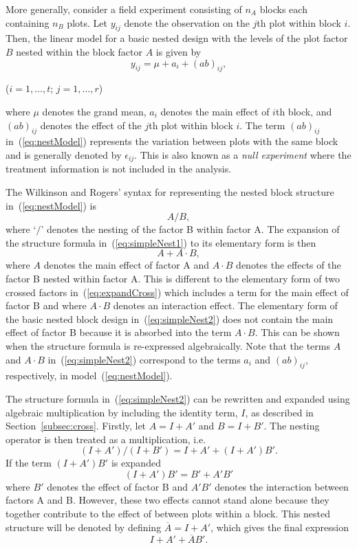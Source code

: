 \documentclass[article]{jss}
\begin{document}
More generally, consider a field experiment consisting of $n_A$ blocks each containing $n_B$ plots. Let $y_{ij}$ denote the observation on the $j$th plot within block $i$. Then, the linear model for a basic nested design with the levels of the plot factor $B$ nested within the block factor $A$ is given by
\begin{equation}\label{eq:nestModel}
y_{ij}= \mu + a_{i} + (ab)_{ij},
\end{equation}
\begin{center}
($i=1,\dots ,t$; $j=1,\dots,r$)
\end{center}
where $\mu$ denotes the grand mean, $a_{i}$ denotes the main effect of $i$th block, and $(ab)_{ij}$ denotes the effect of the $j$th plot within block $i$. The term $(ab)_{ij}$ in~(\ref{eq:nestModel}) represents the variation between plots with the same block and is generally denoted by $\epsilon_{ij}$. This is also known as a \emph{null experiment} where the treatment information is not included in the analysis.

The Wilkinson and Rogers' syntax for representing the nested block structure in~(\ref{eq:nestModel}) is
\begin{equation} \label{eq:simpleNest1}
A/B,
\end{equation}
where `$/$' denotes the nesting of the factor B within factor A. The expansion of the structure formula in~(\ref{eq:simpleNest1}) to its elementary form is then
\begin{equation}\label{eq:simpleNest2}
A + A\cdot B,
\end{equation}
where $A$ denotes the main effect of factor A and $A\cdot B$ denotes the effects of the factor B nested within factor A. This is different to the elementary form of two crossed factors in~(\ref{eq:expandCross}) which includes a term for the main effect of factor B and where $A\cdot B$ denotes an interaction effect. The elementary form of the basic nested block design in~(\ref{eq:simpleNest2}) does not contain the main effect of factor B because it is absorbed into the term $A\cdot B$. This can be shown when the structure formula is re-expressed algebraically. Note that the terms $A$ and $A\cdot B$ in~(\ref{eq:simpleNest2}) correspond to the terms $a_{i}$ and $(ab)_{ij}$, respectively, in model~(\ref{eq:nestModel}).

The structure formula in~(\ref{eq:simpleNest2}) can be rewritten and expanded using algebraic multiplication by including the identity term, $I$, as described in Section~\ref{subsec:cross}. Firstly, let $A = I+A'$ and $B = I+B'$. The nesting operator is then treated as a multiplication, i.e.
\[(I + A')/(I + B') = I + A'+ (I + A')B'.\]
If the term $(I + A')B'$ is expanded
\[(I + A')B' = B' + A'B' \]
where $B'$ denotes the effect of factor B and $A'B'$ denotes the interaction between factors A and B. However, these two effects cannot stand alone because they together contribute to the effect of between plots within a block. This nested structure will be denoted by defining $\overline{A}=I+A'$, which gives the final expression
\begin{equation}\label{eq:expandSimpleNest}
I + A'+ \overline{A}B'.
\end{equation}
\end{document}
